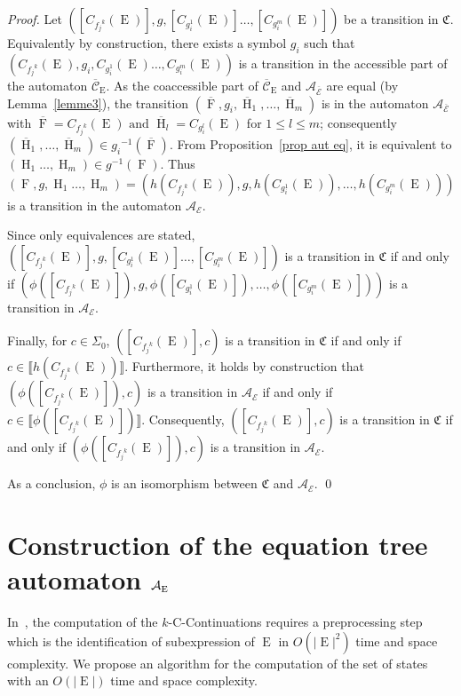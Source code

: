 \documentclass{llncs}
\DeclareMathOperator{\E}{E}
\DeclareMathOperator{\h}{H}
\DeclareMathOperator{\f}{F}
\def\b#1{\overline{#1}}
\begin{document}
\begin{proof}
  Let $([C_{{f_j}^k}(\E)],g,[C_{{g^1_i}}(\E)]\ldots,[C_{{g^m_i}}(\E)])$ be a transition in $\mathfrak{C}$. Equivalently by construction, there exists a symbol $g_i$ such that $(C_{{f_j}^k}(\E),g_i,C_{{g^1_i}}(\E)\ldots,C_{{g^m_i}}(\E))$ is a transition in the accessible part of the automaton $\b{\mathcal{C}}_{\E}$. As the coaccessible part of $\b{\mathcal{C}}_{\E}$ and $\mathcal{A_{\b\E}}$ are equal (by Lemma~\ref{lemme3}), the transition $(\b\f,g_i,\b{\h}_1,\ldots,\b{\h}_m)$ is in the automaton $\mathcal{A_{\b\E}}$ with $\b\f=C_{{f_j}^k}(\E)\mbox{ and }\b{\h}_l=C_{{g^l_i}}(\E)$ for $1\leq l\leq m$; consequently $(\b{\h}_1,\ldots,\b{\h}_m)\in {g_i}^{-1}(\b\f)$.  From Proposition~\ref{prop aut eq}, it is equivalent to $(\h_1\ldots,\h_m)\in g^{-1}(\f)$. Thus $(\f,g,\h_1\ldots,\h_m)=(h(C_{{f_j}^k}(\E)),g,h(C_{{g^1_i}}(\E)),\ldots,h(C_{{g^m_i}}(\E)))$ is a transition in the automaton $\mathcal{A_{\E}}$. 
  
  Since only equivalences are stated, $([C_{{f_j}^k}(\E)],g,[C_{{g^1_i}}(\E)]\ldots,[C_{{g^m_i}}(\E)])$ is a transition in $\mathfrak{C}$ if and only if $(\phi([C_{{f_j}^k}(\E)]),g,\phi([C_{{g^1_i}}(\E)]),\ldots,\phi([C_{{g^m_i}}(\E)]))$ is a transition in $\mathcal{A_{\E}}$. 
   
  Finally, for $c\in \Sigma_0$, $([C_{{f_j}^k}(\E)],c)$ is a transition in $\mathfrak{C}$ if and only if $c\in\llbracket h(C_{{f_j}^k}(\E))\rrbracket$. Furthermore, it holds by construction that $(\phi([C_{{f_j}^k}(\E)]),c)$ is a transition in $\mathcal{A_{\E}}$ if and only if $c\in\llbracket \phi([C_{{f_j}^k}(\E)]) \rrbracket$. Consequently, $([C_{{f_j}^k}(\E)],c)$ is a transition in $\mathfrak{C}$ if and only if $(\phi([C_{{f_j}^k}(\E)]),c)$ is a transition in $\mathcal{A_{\E}}$.
  
  As a conclusion, $\phi$ is an isomorphism between $\mathfrak{C}$ and $\mathcal{A_{\E}}$.
 \qed
\end{proof}

\section{Construction of the equation tree automaton ${\cal A_{\E}}$}\label{sec:algo}

In~\cite{automate2}, the computation of the $k$-C-Continuations requires a preprocessing step which is the identification of subexpression of $\E$ in $O(|\E|^2 )$ time and space complexity. We propose an algorithm for the computation of the set of states with an $O(|\E|)$ time and space complexity.
\end{document}
